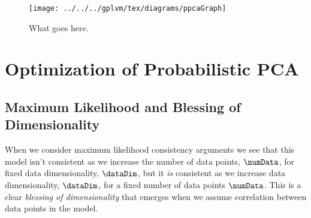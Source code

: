 \begin{figure}
  \begin{center}
    \texttt{[image: ../../../gplvm/tex/diagrams/ppcaGraph]}
  \end{center}
  \caption{What goes here.}
\end{figure}




\section{Optimization of Probabilistic PCA}\label{sec:ppcaOptimize}



\subsection{Maximum Likelihood and Blessing of Dimensionality}

When we consider maximum likelihood consistency arguments \citep[see
e.g.][pg 126]{Wasserman:all03} we see that this model isn't consistent
as we increase the number of data points, $\numData$, for fixed data
dimensionality, $\dataDim$, but it \emph{is} consistent as we increase
data dimensionality, $\dataDim$, for a fixed number of data points
$\numData$. This is a clear \emph{blessing of dimensionality} that
emerges when we assume correlation between data points in the model.

